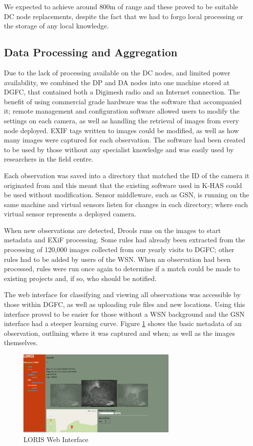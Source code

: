 				We expected to achieve around 800m of range and these proved to be suitable DC node replacements, despite the fact that we had to forgo local processing or the storage of any local knowledge.
		\subsection{Data Processing and Aggregation}
				Due to the lack of processing available on the DC nodes, and limited power availability, we combined the DP and DA nodes into one machine stored at DGFC, that contained both a Digimesh radio and an Internet connection. The benefit of using commercial grade hardware was the software that accompanied it; remote management and configuration software allowed users to modify the settings on each camera, as well as handling the retrieval of images from every node deployed. EXIF tags written to images could be modified, as well as how many images were captured for each observation. The software had been created to be used by those without any specialist knowledge and was easily used by researchers in the field centre.
				
				Each observation was saved into a directory that matched the ID of the camera it originated from and this meant that the existing software used in K-HAS could be used without modification. Sensor middleware, such as GSN, is running on the same machine and virtual sensors listen for changes in each directory; where each virtual sensor represents a deployed camera.
				
				When new observations are detected, Drools runs on the images to start metadata and EXiF processing. Some rules had already been extracted from the processing of 120,000 images collected from our yearly visits to DGFC; other rules had to be added by users of the WSN. When an observation had been processed, rules were run once again to determine if a match could be made to existing projects and, if so, who should be notified.
				
				The web interface for classifying and viewing all observations was accessible by those within DGFC, as well as uploading rule files and new locations. Using this interface proved to be easier for those without a WSN background and the GSN interface had a steeper learning curve.	Figure \ref{fig:loris} shows the basic metadata of an observation, outlining where it was captured and when; as well as the images themselves.
				
				\begin{figure}[!t]
				\centering
				\includegraphics[width=0.70\textwidth]{Chap6/figures/LORIS}
				\caption{LORIS Web Interface}
				\label{fig:loris}
				\end{figure}
				
